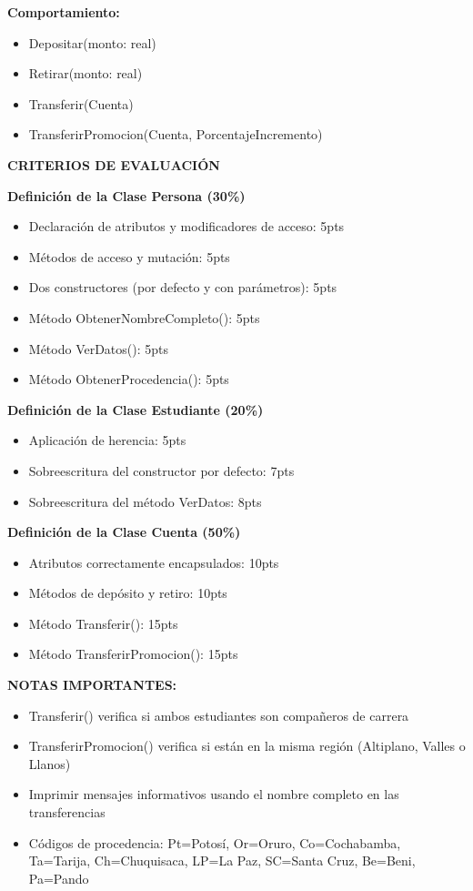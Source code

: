 \documentclass[8pt]{article}
\begin{document}
\begin{multicols}{2}
\textbf{Comportamiento:}
\begin{itemize}[leftmargin=10pt, itemsep=0pt]
    \item Depositar(monto: real)
    \item Retirar(monto: real)
    \item Transferir(Cuenta)
    \item TransferirPromocion(Cuenta, PorcentajeIncremento)
\end{itemize}

\textbf{CRITERIOS DE EVALUACIÓN}

\textbf{Definición de la Clase Persona (30\%)}
\begin{itemize}[leftmargin=12pt, itemsep=0pt]
    \item Declaración de atributos y modificadores de acceso: 5pts
    \item Métodos de acceso y mutación: 5pts
    \item Dos constructores (por defecto y con parámetros): 5pts
    \item Método ObtenerNombreCompleto(): 5pts
    \item Método VerDatos(): 5pts
    \item Método ObtenerProcedencia(): 5pts
\end{itemize}

\textbf{Definición de la Clase Estudiante (20\%)}
\begin{itemize}[leftmargin=12pt, itemsep=0pt]
    \item Aplicación de herencia: 5pts
    \item Sobreescritura del constructor por defecto: 7pts
    \item Sobreescritura del método VerDatos: 8pts
\end{itemize}

\textbf{Definición de la Clase Cuenta (50\%)}
\begin{itemize}[leftmargin=12pt, itemsep=0pt]
    \item Atributos correctamente encapsulados: 10pts
    \item Métodos de depósito y retiro: 10pts
    \item Método Transferir(): 15pts
    \item Método TransferirPromocion(): 15pts
\end{itemize}

\textbf{NOTAS IMPORTANTES:}
\begin{itemize}[leftmargin=12pt, itemsep=0pt]
    \item Transferir() verifica si ambos estudiantes son compañeros de carrera
    \item TransferirPromocion() verifica si están en la misma región (Altiplano, Valles o Llanos)
    \item Imprimir mensajes informativos usando el nombre completo en las transferencias
    \item Códigos de procedencia: Pt=Potosí, Or=Oruro, Co=Cochabamba, Ta=Tarija, Ch=Chuquisaca, LP=La Paz, SC=Santa Cruz, Be=Beni, Pa=Pando
\end{itemize}

\end{multicols}
\end{document}
